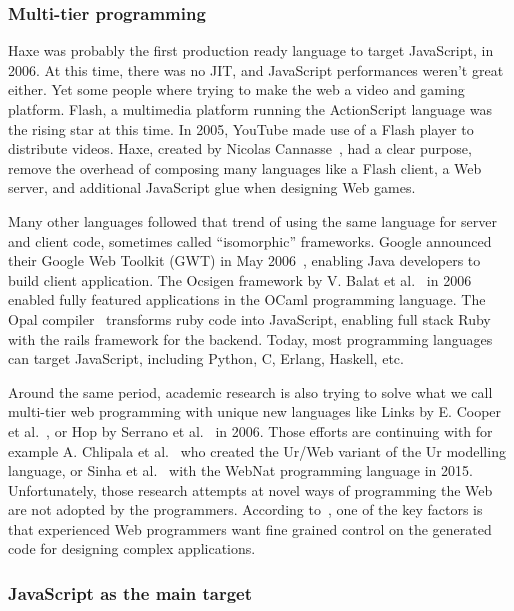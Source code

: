 \subsubsection{Multi-tier programming}%
\label{ssub:multitier}

Haxe was probably the first production ready language to target JavaScript, in 2006.
At this time, there was no JIT, and JavaScript performances weren't great either.
Yet some people where trying to make the web a video and gaming platform.
Flash, a multimedia platform running the ActionScript language was the rising star at this time.
In 2005, YouTube made use of a Flash player to distribute videos.
Haxe, created by Nicolas Cannasse~\cite{haxe-interview},
had a clear purpose, remove the overhead of composing many languages like a Flash client,
a Web server, and additional JavaScript glue when designing Web games.

Many other languages followed that trend of using the same language
for server and client code, sometimes called ``isomorphic'' frameworks.
Google announced their Google Web Toolkit (GWT) in May 2006~\cite{gwt},
enabling Java developers to build client application.
The Ocsigen framework by V. Balat et al.~\cite{balat2006ocsigen} in 2006
enabled fully featured applications in the OCaml programming language.
The Opal compiler~\cite{opalrb} transforms ruby code into JavaScript,
enabling full stack Ruby with the rails framework for the backend.
Today, most programming languages can target JavaScript,
including Python, C, Erlang, Haskell, etc.

Around the same period, academic research is also trying to solve
what we call multi-tier web programming with unique new languages like Links
by E. Cooper et al.~\cite{cooper2006links},
or Hop by Serrano et al.~\cite{serrano2006hop} in 2006.
Those efforts are continuing with for example
A. Chlipala et al.~\cite{chlipala2015ur} who created the Ur/Web variant
of the Ur modelling language,
or Sinha et al.~\cite{sinha2015simplifying} with the WebNat programming language in 2015.
Unfortunately, those research attempts at novel ways of programming the Web
are not adopted by the programmers.
According to~\cite{sinha2015simplifying},
one of the key factors is that experienced Web programmers want fine grained
control on the generated code for designing complex applications.

\subsubsection{JavaScript as the main target}%
\label{ssub:javascript_as_the_main_target}

